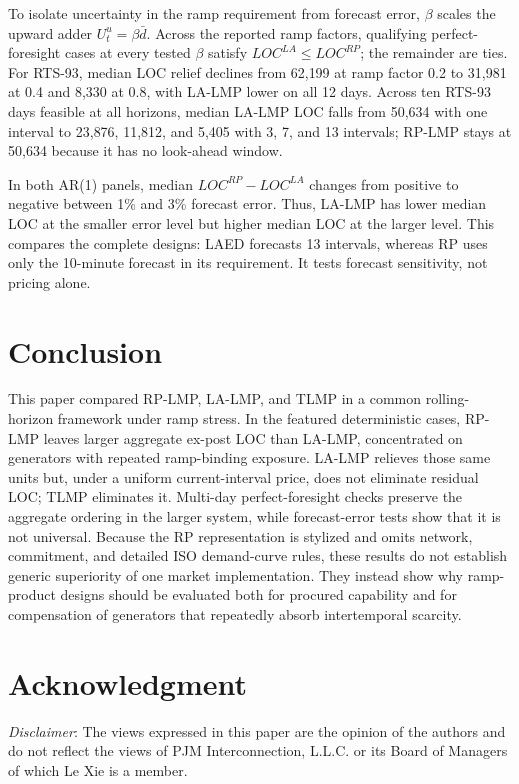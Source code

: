 \documentclass[conference]{IEEEtran}
\begin{document}
To isolate uncertainty in the ramp requirement from forecast error, $\beta$ scales the upward adder $U_t^u=\beta\bar d$. Across the reported ramp factors, qualifying perfect-foresight cases at every tested $\beta$ satisfy \mbox{$LOC^{LA}\le LOC^{RP}$}; the remainder are ties. For RTS-93, median LOC relief declines from 62{,}199 at ramp factor 0.2 to 31{,}981 at 0.4 and 8{,}330 at 0.8, with LA-LMP lower on all 12 days. Across ten RTS-93 days feasible at all horizons, median LA-LMP LOC falls from 50{,}634 with one interval to 23{,}876, 11{,}812, and 5{,}405 with 3, 7, and 13 intervals; RP-LMP stays at 50{,}634 because it has no look-ahead window.

In both AR(1) panels, median $LOC^{RP}-LOC^{LA}$ changes from positive to negative between 1\% and 3\% forecast error. Thus, LA-LMP has lower median LOC at the smaller error level but higher median LOC at the larger level. This compares the complete designs: LAED forecasts 13 intervals, whereas RP uses only the 10-minute forecast in its requirement. It tests forecast sensitivity, not pricing alone.

\section{Conclusion}
\label{sec:conclusion}
This paper compared RP-LMP, LA-LMP, and TLMP in a common rolling-horizon framework under ramp stress. In the featured deterministic cases, RP-LMP leaves larger aggregate ex-post LOC than LA-LMP, concentrated on generators with repeated ramp-binding exposure. LA-LMP relieves those same units but, under a uniform current-interval price, does not eliminate residual LOC; TLMP eliminates it. Multi-day perfect-foresight checks preserve the aggregate ordering in the larger system, while forecast-error tests show that it is not universal. Because the RP representation is stylized and omits network, commitment, and detailed ISO demand-curve rules, these results do not establish generic superiority of one market implementation. They instead show why ramp-product designs should be evaluated both for procured capability and for compensation of generators that repeatedly absorb intertemporal scarcity.

\section{Acknowledgment}
\emph{Disclaimer}: The views expressed in this paper are the opinion of the authors and do not reflect the views of PJM Interconnection, L.L.C. or its Board of Managers of which Le Xie is a member.



\end{document}
